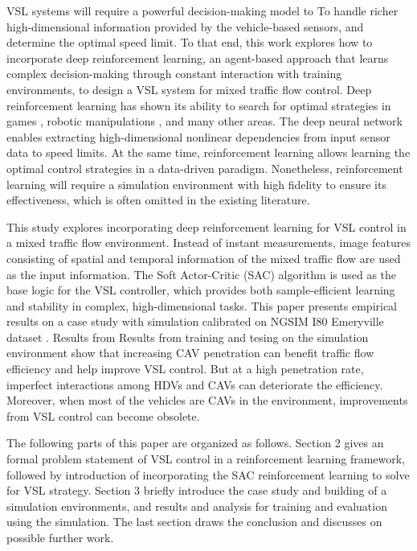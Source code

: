 \documentclass[11pt, letterpaper]{article}
\begin{document}
VSL systems will require a powerful decision-making model to To handle richer high-dimensional information provided by the vehicle-based sensors, and determine the optimal speed limit. To that end, this work explores how to incorporate deep reinforcement learning, an agent-based approach that learns complex decision-making through constant interaction with training environments, to design a VSL system for mixed traffic flow control. Deep reinforcement learning has shown its ability to search for optimal strategies in games \citep{silver2016mastering, https://doi.org/10.48550/arxiv.1712.01815, https://doi.org/10.48550/arxiv.2011.12692}, robotic manipulations \citep{8675643}, and many other areas. The deep neural network enables extracting high-dimensional nonlinear dependencies from input sensor data to speed limits. At the same time, reinforcement learning allows learning the optimal control strategies in a data-driven paradigm. Nonetheless, reinforcement learning will require a simulation environment with high fidelity to ensure its effectiveness, which is often omitted in the existing literature.

This study explores incorporating deep reinforcement learning for VSL control in a mixed traffic flow environment. Instead of instant measurements, image features consisting of spatial and temporal information of the mixed traffic flow are used as the input information. The Soft Actor-Critic (SAC) algorithm \citep{pmlr-v80-haarnoja18b} is used as the base logic for the VSL controller, which provides both sample-efficient learning and stability in complex, high-dimensional tasks. This paper presents empirical results on a case study with simulation calibrated on NGSIM I80 Emeryville dataset \citep*{ngsim2020}. Results from Results from training and tesing on the simulation environment show that increasing CAV penetration can benefit traffic flow efficiency and help improve VSL control. But at a high penetration rate, imperfect interactions among HDVs and CAVs can deteriorate the efficiency. Moreover, when most of the vehicles are CAVs in the environment, improvements from VSL control can become obsolete. %

The following parts of this paper are organized as follows. Section 2 gives an formal problem statement of VSL control in a reinforcement learning framework, followed by introduction of incorporating the SAC reinforcement learning to solve for VSL strategy. Section 3 briefly introduce the case study and building of a simulation environments, and results and analysis for training and evaluation using the simulation. The last section draws the conclusion and discusses on possible further work.
\end{document}
